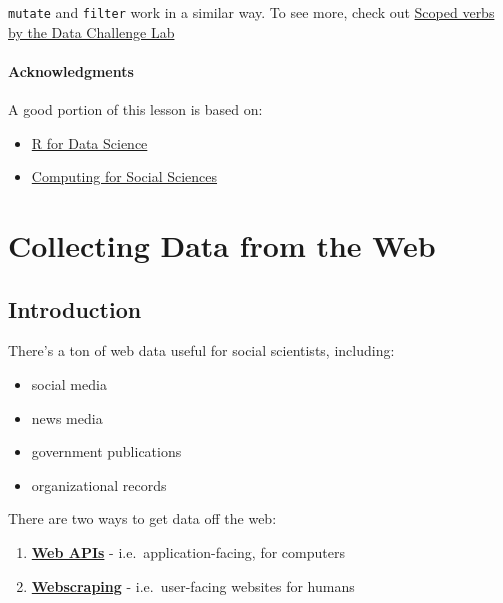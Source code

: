 \documentclass[]{book}
\providecommand{\tightlist}{%
  \setlength{\itemsep}{0pt}\setlength{\parskip}{0pt}}
\begin{document}
\texttt{mutate} and \texttt{filter} work in a similar way. To see more,
check out
\href{https://dcl-2017-04.github.io/curriculum/manip-scoped.html}{Scoped
verbs by the Data Challenge Lab}

\subsubsection*{Acknowledgments}\label{acknowledgments-5}

A good portion of this lesson is based on:

\begin{itemize}
\tightlist
\item
  \href{https://r4ds.had.co.nz/iteration.html}{R for Data Science}
\item
  \href{https://cfss.uchicago.edu/notes/iteration/}{Computing for Social
  Sciences}
\end{itemize}

\chapter{Collecting Data from the
Web}\label{collecting-data-from-the-web}

\section{Introduction}\label{introduction-2}

There's a ton of web data useful for social scientists, including:

\begin{itemize}
\tightlist
\item
  social media
\item
  news media
\item
  government publications
\item
  organizational records
\end{itemize}

There are two ways to get data off the web:

\begin{enumerate}
\def\labelenumi{\arabic{enumi}.}
\tightlist
\item
  \textbf{\protect\hyperlink{web-apis}{Web APIs}} -
  i.e.~application-facing, for computers
\item
  \textbf{\protect\hyperlink{webscraping}{Webscraping}} -
  i.e.~user-facing websites for humans
\end{enumerate}
\end{document}
